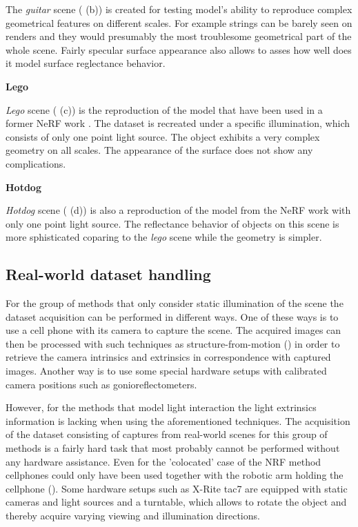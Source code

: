 The \textit{guitar} scene ( (b)) is created for testing model's ability
to reproduce complex geometrical features on different scales.
For example strings can be barely seen on renders and they would presumably the most troublesome geometrical part of the whole scene.
Fairly specular surface appearance also allows to asses how well does it model surface reglectance behavior.

\textbf{Lego}

\textit{Lego} scene ( (c)) is the reproduction of the model
that have been used in a former NeRF work \cite{mildenhall2020nerf}.
The dataset is recreated under a specific illumination,
which consists of only one point light source.
The object exhibits a very complex geometry on all scales.
The appearance of the surface does not show any complications.

\textbf{Hotdog}

\textit{Hotdog} scene ( (d)) is also a reproduction of the model
from the NeRF work with only one point light source.
The reflectance behavior of objects on this scene is more sphisticated
coparing to the \textit{lego} scene while the geometry is simpler.


\subsection{Real-world dataset handling}

For the group of methods that only consider static illumination of the scene
the dataset acquisition can be performed in different ways.
One of these ways is to use a cell phone with its camera to capture the scene.
The acquired images can then be processed with such techniques as
structure-from-motion (\cite{Moulon2012, Jancosek2011, schoenberger2016structure})
in order to retrieve the camera intrinsics and extrinsics in correspondence with captured images.
Another way is to use some special hardware setups with calibrated camera positions
such as gonioreflectometers.

However, for the methods that model light interaction the light extrinsics information is lacking
when using the aforementioned techniques.
The acquisition of the dataset consisting of captures from real-world scenes
for this group of methods is a fairly hard task that most probably cannot be performed without any hardware assistance.
Even for the 'colocated' case of the NRF method cellphones could only have been used
together with the robotic arm holding the cellphone (\cite{bi2020neural}).
Some hardware setups such as X-Rite tac7 \cite{merzbach2017highquality} are equipped with static cameras and light sources
and a turntable, which allows to rotate the object and thereby acquire varying viewing and illumination directions.



